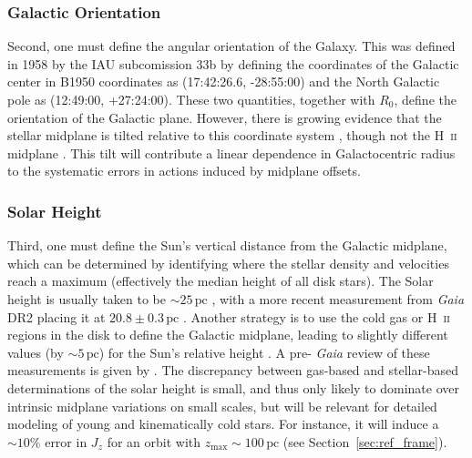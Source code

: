 \documentclass[twocolumn]{aastex62}
\newcommand{\pc}{\text{pc}}
\begin{document}
\subsubsection{Galactic Orientation}
Second, one must define the angular orientation of the Galaxy. This was
defined in 1958 by the IAU subcomission 33b \citep{1960MNRAS.121..123B} by
defining the coordinates of the Galactic center in B1950 coordinates as
(17:42:26.6, -28:55:00) and the North Galactic pole as (12:49:00, +27:24:00).
These two quantities, together with $R_0$, define the orientation of the
Galactic plane. However, there is growing evidence that the stellar midplane
is tilted relative to this coordinate system \citep{2014ApJ...797...53G,
2016ARAA..54..529B}, though not the H~\textsc{ii} midplane
\citep{2019ApJ...871..145A}.  This tilt will contribute a linear dependence in Galactocentric radius to the systematic errors in actions induced by midplane offsets.

\subsubsection{Solar Height}
Third, one must define the Sun's vertical distance from the Galactic midplane,
which can be determined by identifying where the stellar density and
velocities reach a maximum (effectively the median height of all disk stars).
The Solar height is usually taken to be $\sim 25\,\pc$
\citep{2001ApJ...553..184C}, with a more recent measurement from \textit{Gaia}
DR2 placing it at $20.8 \pm 0.3\,\pc$ \citep{2019MNRAS.482.1417B}. Another
strategy is to use the cold gas or H~\textsc{ii} regions in the disk to define
the Galactic midplane, leading to slightly different values (by $\sim 5\,\pc$)
for the Sun's relative height \citep[e.g.][]{2019ApJ...871..145A}. A pre-{\em
Gaia} review of these measurements is given by \citet{2016ARAA..54..529B}. The discrepancy between gas-based and stellar-based determinations of the solar height is small, and thus only likely to dominate over intrinsic midplane variations on small scales, but will be relevant for detailed modeling of young and kinematically cold stars. For instance, it will induce a $\sim10\%$ error in $J_z$ for an
orbit with $z_{\text{max}}\sim100\,\pc$ (see Section~\ref{sec:ref_frame}).
\end{document}
